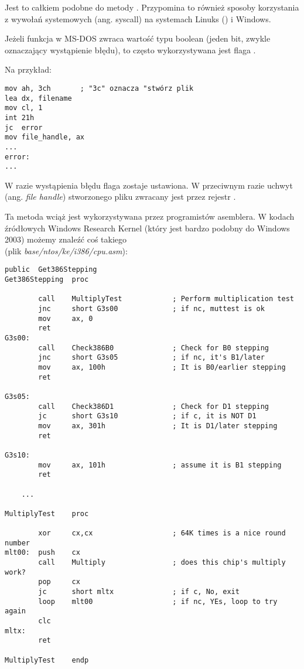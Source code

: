 Jest to całkiem podobne do metody .
Przypomina to również sposoby korzystania z wywołań systemowych (ang. syscall) na systemach Linuks () i Windows.

Jeżeli funkcja w MS-DOS zwraca wartość typu boolean (jeden bit, zwykle oznaczający wystąpienie błędu), to często wykorzystywana jest flaga .

Na przykład:

\begin{lstlisting}[style=customasmx86]
mov ah, 3ch       ; "3c" oznacza "stwórz plik
lea dx, filename
mov cl, 1
int 21h
jc  error
mov file_handle, ax
...
error:
...
\end{lstlisting}

W razie wystąpienia błędu flaga  zostaje ustawiona. W przeciwnym razie uchwyt (ang. \emph{file handle}) stworzonego pliku zwracany jest przez rejestr .

Ta metoda wciąż jest wykorzystywana przez programistów asemblera.
W kodach źródłowych Windows Research Kernel (który jest bardzo podobny do Windows 2003) możemy znaleźć coś takiego\\
(plik \emph{base/ntos/ke/i386/cpu.asm}):

\begin{lstlisting}[style=customasmx86]
        public  Get386Stepping
Get386Stepping  proc

        call    MultiplyTest            ; Perform multiplication test
        jnc     short G3s00             ; if nc, muttest is ok
        mov     ax, 0
        ret
G3s00:
        call    Check386B0              ; Check for B0 stepping
        jnc     short G3s05             ; if nc, it's B1/later
        mov     ax, 100h                ; It is B0/earlier stepping
        ret

G3s05:
        call    Check386D1              ; Check for D1 stepping
        jc      short G3s10             ; if c, it is NOT D1
        mov     ax, 301h                ; It is D1/later stepping
        ret

G3s10:
        mov     ax, 101h                ; assume it is B1 stepping
        ret

	...

MultiplyTest    proc

        xor     cx,cx                   ; 64K times is a nice round number
mlt00:  push    cx
        call    Multiply                ; does this chip's multiply work?
        pop     cx
        jc      short mltx              ; if c, No, exit
        loop    mlt00                   ; if nc, YEs, loop to try again
        clc
mltx:
        ret

MultiplyTest    endp
\end{lstlisting}



